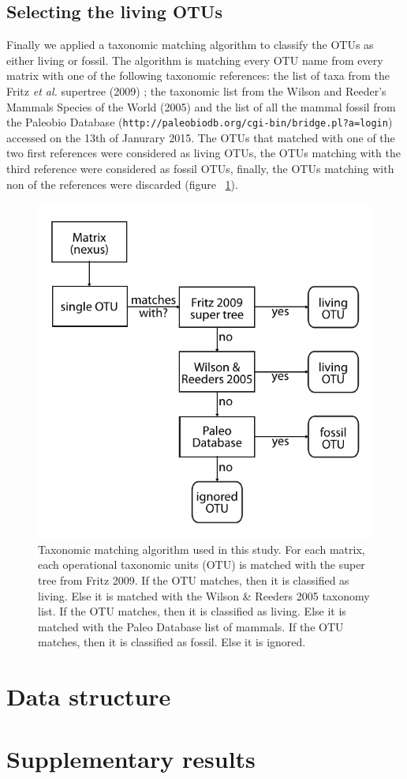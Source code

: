 \subsection{Selecting the living OTUs}
Finally we applied a taxonomic matching algorithm to classify the OTUs as either living or fossil. The algorithm is matching every OTU name from every matrix with one of the following taxonomic references: the list of taxa from the Fritz \textit{et al.} supertree (2009) \cite{FritzTree}; the taxonomic list from the Wilson and Reeder's Mammals Species of the World (2005) \cite{wilson2005mammal} and the list of all the mammal fossil from the Paleobio Database (\texttt{http://paleobiodb.org/cgi-bin/bridge.pl?a=login}) accessed on the 13th of Janurary 2015. The OTUs that matched with one of the two first references were considered as living OTUs, the OTUs matching with the third reference were considered as fossil OTUs, finally, the OTUs matching with non of the references were discarded (figure ~\ref{Supp_figure_Taxonomic_algorithm}).

\begin{figure}[!htbp]
\centering
    \includegraphics[width=1\textwidth]{Supplementary/Supp_figure_Taxonomic_algorithm.pdf}
\caption{Taxonomic matching algorithm used in this study. For each matrix, each operational taxonomic units (OTU) is matched with the super tree from Fritz 2009. If the OTU matches, then it is classified as living. Else it is matched with the Wilson \& Reeders 2005 taxonomy list. If the OTU matches, then it is classified as living. Else it is matched with the Paleo Database list of mammals. If the OTU matches, then it is classified as fossil. Else it is ignored.}
\label{Supp_figure_Taxonomic_algorithm}
\end{figure}





\section{Data structure}

\section{Supplementary results}
